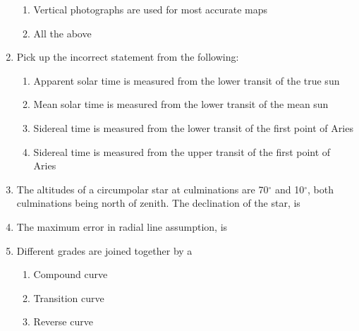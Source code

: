 \documentclass[11pt,a4paper]{article}
\begin{document}
\begin{enumerate}
\begin{enumerate}[label=\Alph*.]
\item{Vertical photographs are used for most accurate maps}
\item{All the above}
\end{enumerate}
\item{Pick up the incorrect statement from the following:}
\begin{enumerate}[label=\Alph*.]
\item{Apparent solar time is measured from the lower transit of the true sun}
\item{Mean solar time is measured from the lower transit of the mean sun}
\item{Sidereal time is measured from the lower transit of the first point of Aries}
\item{Sidereal time is measured from the upper transit of the first point of Aries}
\end{enumerate}
\item{The altitudes of a circumpolar star at culminations are 70$^\circ$ and 10$^\circ$, both culminations being north of zenith. The declination of the star, is
}
\\
\item{The maximum error in radial line assumption, is}
\\
\item{Different grades are joined together by a}
\begin{enumerate}[label=\Alph*.]
\item{Compound curve}
\item{Transition curve}
\item{Reverse curve}

\end{enumerate}
\end{enumerate}
\end{document}
